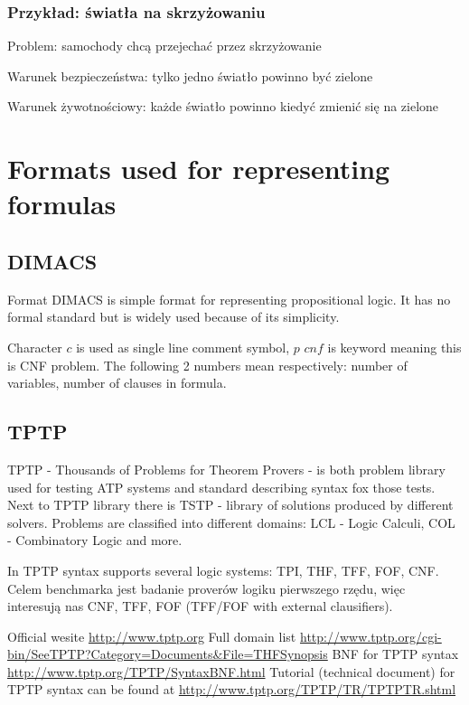 \subsubsection{Przykład: światła na skrzyżowaniu}

\noindent
Problem: samochody chcą przejechać przez skrzyżowanie

\noindent
Warunek bezpieczeństwa: tylko jedno światło powinno być zielone

\noindent
Warunek żywotnościowy: każde światło powinno kiedyć zmienić się na zielone

\section{Formats used for representing formulas}



\subsection{DIMACS}

Format DIMACS is simple format for representing propositional logic. It has no formal standard but is widely used because of its simplicity.

Character $c$ is used as single line comment symbol, $p$ $cnf$ is keyword meaning this is \gls{CNF} problem. The following 2 numbers mean respectively: number of variables, number of clauses in formula.

\subsection{TPTP}

TPTP - Thousands of Problems for Theorem Provers - is both problem library used for testing \gls{ATP} systems and standard describing syntax fox those tests. Next to TPTP library there is \gls{TSTP} - library of solutions produced by different solvers. Problems are classified into different domains: LCL - Logic Calculi, COL - Combinatory Logic and more.

In TPTP syntax supports several logic systems: \gls{TPI}, \gls{THF}, \gls{TFF}, \gls{FOF}, \gls{CNF}. Celem benchmarka jest badanie proverów logiku pierwszego rzędu, więc interesują nas \gls{CNF}, \gls{TFF}, \gls{FOF} (TFF/FOF with external clausifiers).

\noindent
Official wesite \url{http://www.tptp.org}
\newline
Full domain list \url{http://www.tptp.org/cgi-bin/SeeTPTP?Category=Documents&File=THFSynopsis}
\newline
\gls{BNF} for TPTP syntax \url{http://www.tptp.org/TPTP/SyntaxBNF.html}
\newline
Tutorial (technical document) for TPTP syntax can be found at \url{http://www.tptp.org/TPTP/TR/TPTPTR.shtml}

